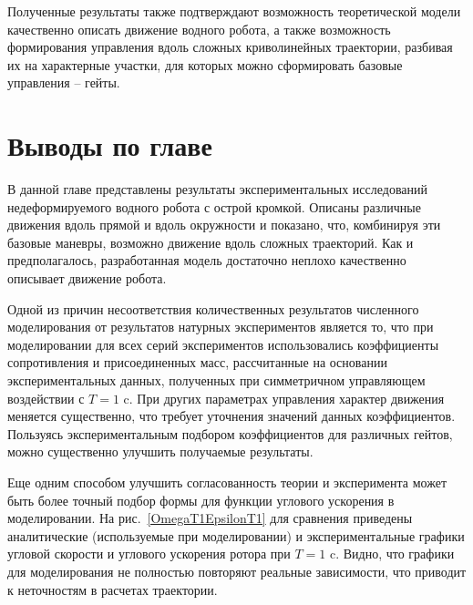 
Полученные результаты также подтверждают возможность теоретической модели качественно описать движение водного робота, а также возможность формирования управления вдоль сложных криволинейных траектории, разбивая их на характерные участки, для которых можно сформировать базовые управления -- гейты. 

\section{Выводы по главе}

В данной главе представлены результаты экспериментальных исследований недеформируемого водного робота с острой кромкой. Описаны различные движения вдоль прямой и вдоль окружности и показано, что, комбинируя эти базовые маневры, возможно движение вдоль сложных траекторий. Как и предполагалось, разработанная модель достаточно неплохо качественно описывает движение робота.

Одной из причин несоответствия количественных результатов численного моделирования от результатов натурных экспериментов является то, что при моделировании для всех серий экспериментов использовались коэффициенты сопротивления и присоединенных масс, рассчитанные на основании экспериментальных  данных, полученных при симметричном управляющем воздействии с $T = 1$ c. При других параметрах управления характер движения меняется существенно, что требует уточнения значений данных коэффициентов. Пользуясь экспериментальным подбором коэффициентов для различных гейтов, можно существенно улучшить получаемые результаты.

Еще одним способом улучшить согласованность теории и эксперимента может быть более точный подбор формы для функции углового ускорения в моделировании. На рис.~\ref{OmegaT1EpsilonT1} для сравнения приведены аналитические (используемые при моделировании) и экспериментальные графики угловой скорости и углового ускорения ротора при $ T = 1 $ c. Видно, что графики для моделирования не полностью повторяют реальные зависимости, что приводит к неточностям в расчетах траектории.

